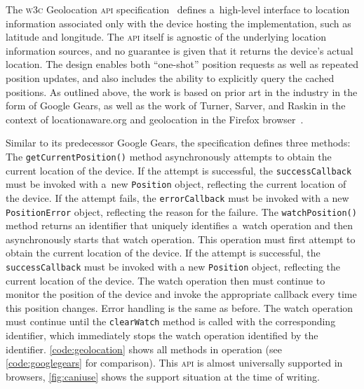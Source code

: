 \documentclass[sigconf,hyphens]{acmart}
\begin{document}
The \textsc{w3c} Geolocation \textsc{api} specification~\cite{popescu2016geolocation}
defines a~high-level interface to location information
associated only with the device hosting the implementation, such as latitude and longitude.
The \textsc{api} itself is agnostic of the underlying location information sources,
and no guarantee is given that it returns the device's actual location.
The design enables both ``one-shot'' position requests as well as repeated position updates,
and also includes the ability to explicitly query the cached positions.
As outlined above, the work is based on prior art in the industry in the form of Google Gears,
as well as the work of Turner, Sarver, and Raskin in the context of locationaware.org and
geolocation in the Firefox browser~\cite{raskin2010geolocation}.

Similar to its predecessor Google Gears, the specification defines three methods:
The \texttt{getCurrentPosition()} method asynchronously attempts
to obtain the current location of the device.
If the attempt is successful, the \texttt{successCallback} must be invoked
with a~new \texttt{Position} object, reflecting the current location of the device.
If the attempt fails, the \texttt{errorCallback} must be invoked
with a new \texttt{PositionError} object,
reflecting the reason for the failure.
The \texttt{watchPosition()} method returns an identifier that uniquely
identifies a~watch operation and then asynchronously starts that watch operation.
This operation must first attempt to obtain the current location of the device.
If the attempt is successful, the \texttt{successCallback} must be invoked
with a new \texttt{Position} object, reflecting the current location of the device.
The watch operation then must continue to monitor the position of the device
and invoke the appropriate callback every time this position changes.
Error handling is the same as before.
The watch operation must continue until the \texttt{clearWatch} method
is called with the corresponding identifier,
which immediately stops the watch operation identified by the identifier.
\autoref{code:geolocation} shows all methods in operation
(see \autoref{code:googlegears} for comparison). 
This \textsc{api} is almost universally supported in browsers,
\autoref{fig:caniuse} shows the support situation at the time of writing.
\end{document}
